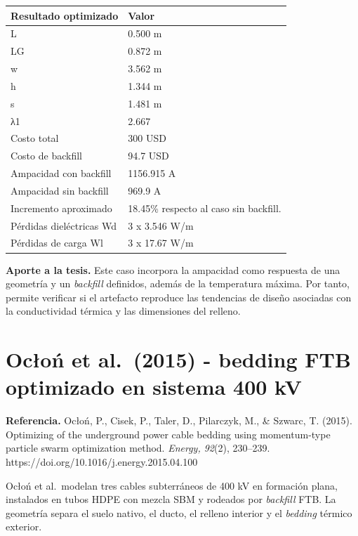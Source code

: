 \documentclass[11pt,a4paper,oneside]{report}
\newcounter{none}
\begin{document}
{\def\LTcaptype{none} %
\begin{longtable}[]{@{}ll@{}}
\toprule\noalign{}
Resultado optimizado & Valor \\
\midrule\noalign{}
\endhead
\bottomrule\noalign{}
\endlastfoot
L & 0.500 m \\
LG & 0.872 m \\
w & 3.562 m \\
h & 1.344 m \\
s & 1.481 m \\
λ1 & 2.667 \\
Costo total & 300 USD \\
Costo de backfill & 94.7 USD \\
Ampacidad con backfill & 1156.915 A \\
Ampacidad sin backfill & 969.9 A \\
Incremento aproximado & 18.45\% respecto al caso sin backfill. \\
Pérdidas dieléctricas Wd & 3 x 3.546 W/m \\
Pérdidas de carga Wl & 3 x 17.67 W/m \\
\end{longtable}
}

\textbf{Aporte a la tesis.} Este caso incorpora la ampacidad como
respuesta de una geometría y un \textit{backfill} definidos, además de
la temperatura máxima. Por tanto, permite verificar si el artefacto
reproduce las tendencias de diseño asociadas con la conductividad
térmica y las dimensiones del relleno.

\section{Ocłoń et al.~(2015) - bedding FTB optimizado en sistema 400
kV}\label{ocux142oux144-et-al.-2015---bedding-ftb-optimizado-en-sistema-400-kv}

\textbf{Referencia.} Ocłoń, P., Cisek, P., Taler, D., Pilarczyk, M., \&
Szwarc, T. (2015). Optimizing of the underground power cable bedding
using momentum-type particle swarm optimization method. \emph{Energy,
92}(2), 230--239. https://doi.org/10.1016/j.energy.2015.04.100

Ocłoń et al.~modelan tres cables subterráneos de 400 kV en formación
plana, instalados en tubos HDPE con mezcla SBM y rodeados por
\textit{backfill} FTB. La geometría separa el suelo nativo, el ducto, el
relleno interior y el \textit{bedding} térmico exterior.
\end{document}
